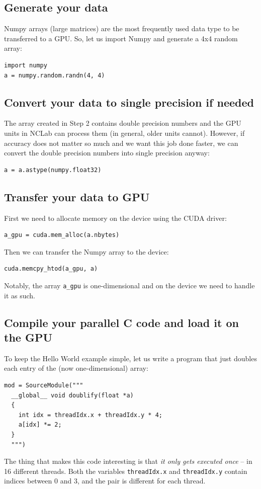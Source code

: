 \documentclass[article,A4,12pt]{llncs}
\begin{document}
\subsection{Generate your data}

Numpy arrays (large matrices) are the most frequently used data type to be 
transferred to a GPU. So, let us import Numpy and generate a 4x4 random array:
\begin{verbatim}
import numpy
a = numpy.random.randn(4, 4)
\end{verbatim}

\subsection{Convert your data to single precision if needed}

The array created in Step 2 contains double precision numbers and the GPU units in NCLab can 
process them (in general, older units cannot). However, if accuracy does not matter so much 
and we want this job done faster, we can convert the double precision numbers into single precision 
anyway:

\begin{verbatim}
a = a.astype(numpy.float32)
\end{verbatim}

\subsection{Transfer your data to GPU}

First we need to allocate memory on the device using the CUDA driver:
\begin{verbatim}
a_gpu = cuda.mem_alloc(a.nbytes)
\end{verbatim}
Then we can transfer the Numpy array to the device:

\begin{verbatim}
cuda.memcpy_htod(a_gpu, a)
\end{verbatim}
Notably, the array {\tt a\_gpu} is one-dimensional and on the device we need to 
handle it as such.

\subsection{Compile your parallel C code and load it on the GPU}

To keep the Hello World example simple, let us write a program that just doubles 
each entry of the (now one-dimensional) array:
\begin{verbatim}
mod = SourceModule("""
  __global__ void doublify(float *a)
  {
    int idx = threadIdx.x + threadIdx.y * 4;
    a[idx] *= 2;
  }
  """)
\end{verbatim}
The thing that makes this code interesting is that {\em it only gets executed
once} -- in 16 different threads. Both the variables {\tt threadIdx.x} and {\tt threadIdx.y}
contain indices between $0$ and $3$, and the pair is different for each thread. 
\end{document}
